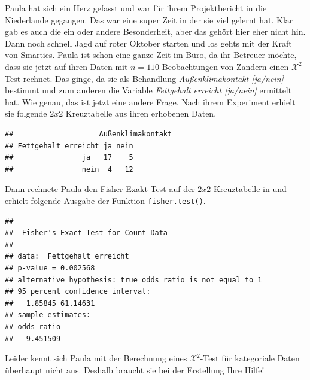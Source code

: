 \documentclass[a4paper, 9pt]{scrartcl}\usepackage[]{graphicx}\usepackage[]{xcolor}
\makeatletter
\newenvironment{kframe}{%
 \def\at@end@of@kframe{}%
 \ifinner\ifhmode%
  \def\at@end@of@kframe{\end{minipage}}%
  \begin{minipage}{\columnwidth}%
 \fi\fi%
 \def\FrameCommand##1{\hskip\@totalleftmargin \hskip-\fboxsep
 \colorbox{shadecolor}{##1}\hskip-\fboxsep
     \hskip-\linewidth \hskip-\@totalleftmargin \hskip\columnwidth}%
 \MakeFramed {\advance\hsize-\width
   \@totalleftmargin\z@ \linewidth\hsize
   \@setminipage}}%
 {\par\unskip\endMakeFramed%
 \at@end@of@kframe}
\newenvironment{knitrout}{}{} %
\makeatother
\begin{document}
Paula hat sich ein Herz gefasst und war für ihrem Projektbericht in die Niederlande gegangen. Das war eine super Zeit in der sie viel gelernt hat. Klar gab es auch die ein oder andere Besonderheit, aber das gehört hier eher nicht hin. Dann noch schnell Jagd auf roter Oktober starten und los gehts mit der Kraft von Smarties. Paula ist schon eine ganze Zeit im Büro, da ihr Betreuer möchte, dass sie jetzt auf ihren Daten mit $n = 110$ Beobachtungen von Zandern einen $\mathcal{X}^2$-Test rechnet. Das ginge, da sie als Behandlung \textit{Außenklimakontakt [ja/nein]} bestimmt und zum anderen die Variable \textit{Fettgehalt erreicht [ja/nein]} ermittelt hat. Wie genau, das ist jetzt eine andere Frage. Nach ihrem Experiment erhielt sie folgende $2x2$ Kreuztabelle aus ihren erhobenen Daten.

\begin{knitrout}
\color{fgcolor}\begin{kframe}
\begin{verbatim}
##                    Außenklimakontakt
## Fettgehalt erreicht ja nein
##                ja   17    5
##                nein  4   12
\end{verbatim}
\end{kframe}
\end{knitrout}

Dann rechnete Paula den Fisher-Exakt-Test auf der $2x2$-Kreuztabelle in \Rlogo und erhielt folgende \Rlogo Ausgabe der Funktion \texttt{fisher.test()}.

\begin{knitrout}
\color{fgcolor}\begin{kframe}
\begin{verbatim}
## 
## 	Fisher's Exact Test for Count Data
## 
## data:  Fettgehalt erreicht
## p-value = 0.002568
## alternative hypothesis: true odds ratio is not equal to 1
## 95 percent confidence interval:
##   1.85845 61.14631
## sample estimates:
## odds ratio 
##   9.451509
\end{verbatim}
\end{kframe}
\end{knitrout}

Leider kennt sich Paula mit der Berechnung eines $\mathcal{X}^2$-Test für kategoriale Daten überhaupt nicht aus. Deshalb braucht sie bei der Erstellung Ihre Hilfe!
\end{document}
